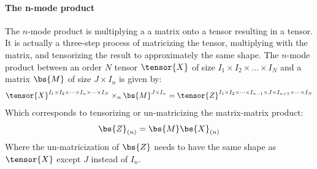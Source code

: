\paragraph{The n-mode product}
The $n$-mode product is multiplying a a matrix onto a tensor resulting in a tensor. It is actually a three-step process of matricizing the tensor, multiplying with the matrix, and tensorizing the result to approximately the same shape. The $n$-mode product between an order $N$ tensor $\tensor{X}$ of size $I_1\times I_2 \times \dots \times I_N$ and a matrix $\bs{M}$ of size $J\times I_n$ is given by:
\begin{equation}
    \tensor{X}^{I_1\times I_2\times \dots \times I_n \times \dots \times I_N} \times_n \bs{M}^{J\times I_n} = \tensor{Z}^{I_1\times I_2 \times \dots \times I_{n-1} \times J \times I_{n+1} \times \dots \times I_N}
\end{equation}
Which corresponds to tensorizing or un-matricizing the matrix-matrix product:
\begin{equation}
    \bs{Z}_{(n)} = \bs{M} \bs{X}_{(n)}
\end{equation}
Where the un-matricization of $\bs{Z}$ needs to have the same shape as $\tensor{X}$ except $J$ instead of $I_n$.

